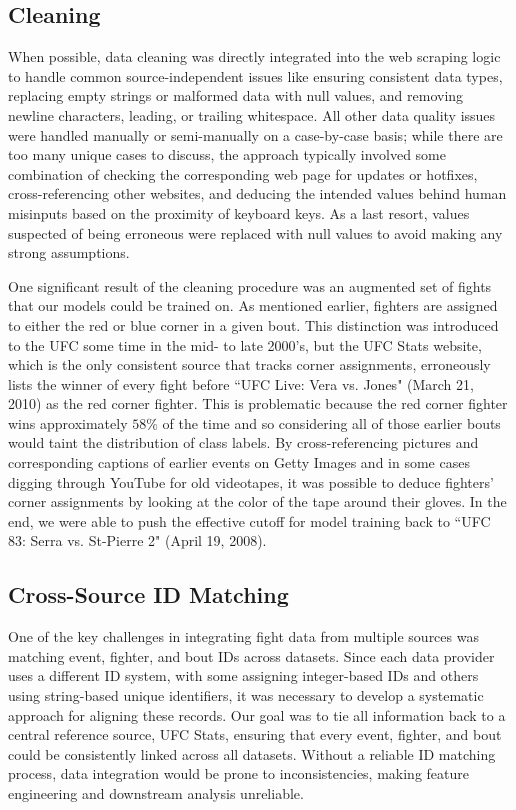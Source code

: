 \documentclass[12pt,twoside]{report}
\begin{document}
\subsection{Cleaning}

When possible, data cleaning was directly integrated into the web scraping logic to handle common source-independent issues like ensuring consistent data types, replacing empty strings or malformed data with null values, and removing newline characters, leading, or trailing whitespace. All other data quality issues were handled manually or semi-manually on a case-by-case basis; while there are too many unique cases to discuss, the approach typically involved some combination of checking the corresponding web page for updates or hotfixes, cross-referencing other websites, and deducing the intended values behind human misinputs based on the proximity of keyboard keys. As a last resort, values suspected of being erroneous were replaced with null values to avoid making any strong assumptions.

One significant result of the cleaning procedure was an augmented set of fights that our models could be trained on. As mentioned earlier, fighters are assigned to either the red or blue corner in a given bout. This distinction was introduced to the UFC some time in the mid- to late 2000's, but the UFC Stats website, which is the only consistent source that tracks corner assignments, erroneously lists the winner of every fight before ``UFC Live: Vera vs. Jones" (March 21, 2010) as the red corner fighter. This is problematic because the red corner fighter wins approximately $58\%$ of the time and so considering all of those earlier bouts would taint the distribution of class labels. By cross-referencing pictures and corresponding captions of earlier events on Getty Images and in some cases digging through YouTube for old videotapes, it was possible to deduce fighters' corner assignments by looking at the color of the tape around their gloves. In the end, we were able to push the effective cutoff for model training back to ``UFC 83: Serra vs. St-Pierre 2" (April 19, 2008).


\subsection{Cross-Source ID Matching}

One of the key challenges in integrating fight data from multiple sources was matching event, fighter, and bout IDs across datasets. Since each data provider uses a different ID system, with some assigning integer-based IDs and others using string-based unique identifiers, it was necessary to develop a systematic approach for aligning these records. Our goal was to tie all information back to a central reference source, UFC Stats, ensuring that every event, fighter, and bout could be consistently linked across all datasets. Without a reliable ID matching process, data integration would be prone to inconsistencies, making feature engineering and downstream analysis unreliable.
\end{document}

